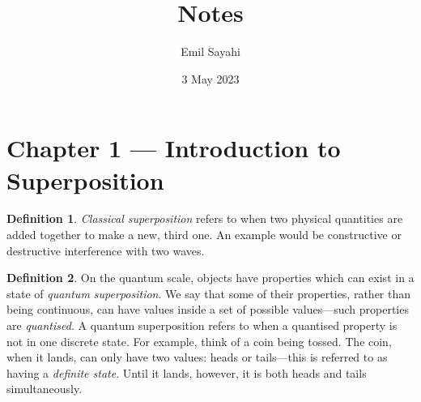 \documentclass{article}
\title{Notes}
\author{Emil Sayahi}
\date{3 May 2023}
\theoremstyle{definition}
\newtheorem{definition}{Definition}[section]
\begin{document}
\maketitle









\section{Chapter 1 --- Introduction to Superposition}

\begin{definition}
    \emph{Classical superposition} refers to when two physical quantities are added together to make a new, third one. An example would be constructive or destructive interference with two waves.
\end{definition}
\begin{definition}
    On the quantum scale, objects have properties which can exist in a state of \emph{quantum superposition}. We say that some of their properties, rather than being continuous, can have values inside a set of possible values---such properties are \emph{quantised}. A quantum superposition refers to when a quantised property is not in one discrete state. For example, think of a coin being tossed. The coin, when it lands, can only have two values: heads or tails---this is referred to as having a \emph{definite state}. Until it lands, however, it is both heads and tails simultaneously.
\end{definition}
\end{document}
